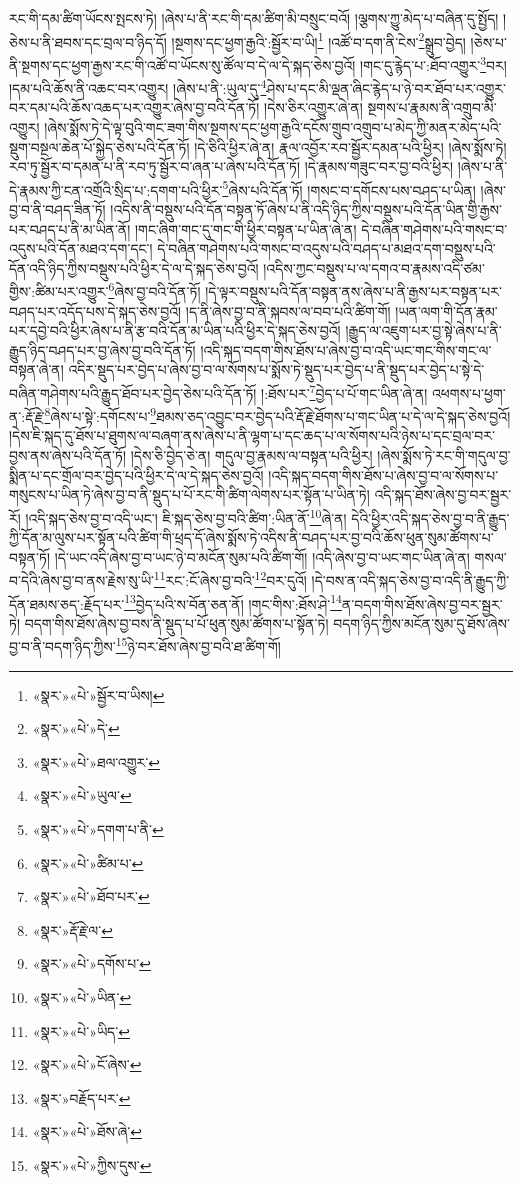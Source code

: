 རང་གི་དམ་ཚིག་ཡོངས་སྤངས་ཏེ། །ཞེས་པ་ནི་རང་གི་དམ་ཚིག་མི་བསྲུང་བའོ། །ལྕགས་ཀྱུ་མེད་པ་བཞིན་དུ་སྤྱོད། །ཅེས་པ་ནི་ཐབས་དང་བྲལ་བ་ཉིད་དོ། །སྔགས་དང་ཕྱག་རྒྱའི་:སྦྱོར་བ་ཡི།\footnote{«སྣར་»«པེ་»སྦྱོར་བ་ཡིས།} །འཚོ་བ་དག་ནི་ངེས་\footnote{«སྣར་»«པེ་»དེ་}སྒྲུབ་བྱེད། །ཅེས་པ་ནི་སྔགས་དང་ཕྱག་རྒྱས་རང་གི་འཚོ་བ་ཡོངས་སུ་ཚོལ་བ་དེ་ལ་དེ་སྐད་ཅེས་བྱའོ། །གང་དུ་རྙེད་པ་:ཐོབ་འགྱུར་\footnote{«སྣར་»«པེ་»ཐལ་འགྱུར་}བར། །དམ་པའི་ཆོས་ནི་འཆང་བར་འགྱུར། །ཞེས་པ་ནི་:ཡུལ་དུ་\footnote{«སྣར་»«པེ་»ཡུལ་}ཤེས་པ་དང་མི་ལྡན་ཞིང་རྙེད་པ་ཉེ་བར་ཐོབ་པར་འགྱུར་བར་དམ་པའི་ཆོས་འཆད་པར་འགྱུར་ཞེས་བྱ་བའི་དོན་ཏོ། །དེས་ཅིར་འགྱུར་ཞེ་ན། སྔགས་པ་རྣམས་ནི་འགྲུབ་མི་འགྱུར། །ཞེས་སྨོས་ཏེ་དེ་ལྟ་བུའི་གང་ཟག་གིས་སྔགས་དང་ཕྱག་རྒྱའི་དངོས་གྲུབ་འགྲུབ་པ་མེད་ཀྱི་མནར་མེད་པའི་སྡུག་བསྔལ་ཆེན་པོ་སྐྱེད་ཅེས་པའི་དོན་ཏོ། །དེ་ཅིའི་ཕྱིར་ཞེ་ན། རྣལ་འབྱོར་རབ་སྦྱོར་དམན་པའི་ཕྱིར། །ཞེས་སྨོས་ཏེ། རབ་ཏུ་སྦྱོར་བ་དམན་པ་ནི་རབ་ཏུ་སྦྱོར་བ་ཞན་པ་ཞེས་པའི་དོན་ཏོ། །དེ་རྣམས་གཟུང་བར་བྱ་བའི་ཕྱིར། །ཞེས་པ་ནི་དེ་རྣམས་ཀྱི་ངན་འགྲོའི་སྲིད་པ་:དགག་པའི་ཕྱིར་\footnote{«སྣར་»«པེ་»དགག་པ་ནི་}ཞེས་པའི་དོན་ཏོ། །གསང་བ་དགོངས་པས་བཤད་པ་ཡིན། །ཞེས་བྱ་བ་ནི་བཤད་ཟིན་ཏོ། །འདིས་ནི་བསྡུས་པའི་དོན་བསྟན་ཏོ་ཞེས་པ་ནི་འདི་ཉིད་ཀྱིས་བསྡུས་པའི་དོན་ཡིན་གྱི་རྒྱས་པར་བཤད་པ་ནི་མ་ཡིན་ནོ། །གང་ཞིག་གང་དུ་གང་གི་ཕྱིར་བསྟན་པ་ཡིན་ཞེ་ན། དེ་བཞིན་གཤེགས་པའི་གསང་བ་འདུས་པའི་དོན་མཐའ་དག་དང་། དེ་བཞིན་གཤེགས་པའི་གསང་བ་འདུས་པའི་བཤད་པ་མཐའ་དག་བསྡུས་པའི་དོན་འདི་ཉིད་ཀྱིས་བསྡུས་པའི་ཕྱིར་དེ་ལ་དེ་སྐད་ཅེས་བྱའོ། །འདིས་ཀྱང་བསྡུས་པ་ལ་དགའ་བ་རྣམས་འདི་ཙམ་གྱིས་:ཚིམ་པར་འགྱུར་\footnote{«སྣར་»«པེ་»ཚིམ་པ་}ཞེས་བྱ་བའི་དོན་ཏོ། །དེ་ལྟར་བསྡུས་པའི་དོན་བསྟན་ནས་ཞེས་པ་ནི་རྒྱས་པར་བསྟན་པར་བཤད་པར་འདོད་པས་དེ་སྐད་ཅེས་བྱའོ། །ད་ནི་ཞེས་བྱ་བ་ནི་སྐབས་ལ་བབ་པའི་ཚིག་གོ། །ཡན་ལག་གི་དོན་རྣམ་པར་དབྱེ་བའི་ཕྱིར་ཞེས་པ་ནི་རྩ་བའི་དོན་མ་ཡིན་པའི་ཕྱིར་དེ་སྐད་ཅེས་བྱའོ། །རྒྱུད་ལ་འཇུག་པར་བྱ་སྟེ་ཞེས་པ་ནི་རྒྱུད་ཉིད་བཤད་པར་བྱ་ཞེས་བྱ་བའི་དོན་ཏོ། །འདི་སྐད་བདག་གིས་ཐོས་པ་ཞེས་བྱ་བ་འདི་ཡང་གང་གིས་གང་ལ་བསྟན་ཞེ་ན། འདིར་སྡུད་པར་བྱེད་པ་ཞེས་བྱ་བ་ལ་སོགས་པ་སྨོས་ཏེ་སྡུད་པར་བྱེད་པ་ནི་སྡུད་པར་བྱེད་པ་སྟེ་དེ་བཞིན་གཤེགས་པའི་རྒྱུད་ཐོབ་པར་བྱེད་ཅེས་པའི་དོན་ཏོ། །:ཐོས་པར་\footnote{«སྣར་»«པེ་»ཐོབ་པར་}བྱེད་པ་པོ་གང་ཡིན་ཞེ་ན། འཕགས་པ་ཕྱག་ན་:རྡོ་རྗེ་\footnote{«སྣར་»རྡོ་རྗེ་ལ་}ཞེས་པ་སྟེ་:དགོངས་པ་\footnote{«སྣར་»«པེ་»དགོས་པ་}ཐམས་ཅད་འབྱུང་བར་བྱེད་པའི་རྡོ་རྗེ་ཐོགས་པ་གང་ཡིན་པ་དེ་ལ་དེ་སྐད་ཅེས་བྱའོ། །དེས་ཇི་སྐད་དུ་ཐོས་པ་ཐུགས་ལ་བཞག་ནས་ཞེས་པ་ནི་ལྷག་པ་དང་ཆད་པ་ལ་སོགས་པའི་ཉེས་པ་དང་བྲལ་བར་བྱས་ནས་ཞེས་པའི་དོན་ཏོ། །དེས་ཅི་བྱེད་ཅེ་ན། གདུལ་བྱ་རྣམས་ལ་བསྟན་པའི་ཕྱིར། །ཞེས་སྨོས་ཏེ་རང་གི་གདུལ་བྱ་སྨིན་པ་དང་གྲོལ་བར་བྱེད་པའི་ཕྱིར་དེ་ལ་དེ་སྐད་ཅེས་བྱའོ། །འདི་སྐད་བདག་གིས་ཐོས་པ་ཞེས་བྱ་བ་ལ་སོགས་པ་གསུངས་པ་ཡིན་ཏེ་ཞེས་བྱ་བ་ནི་སྡུད་པ་པོ་རང་གི་ཚིག་ལེགས་པར་སྟོན་པ་ཡིན་ཏེ། འདི་སྐད་ཐོས་ཞེས་བྱ་བར་སྦྱར་རོ། །འདི་སྐད་ཅེས་བྱ་བ་འདི་ཡང་། ཇི་སྐད་ཅེས་བྱ་བའི་ཚིག་:ཡིན་ནོ་\footnote{«སྣར་»«པེ་»ཡིན་}ཞེ་ན། དེའི་ཕྱིར་འདི་སྐད་ཅེས་བྱ་བ་ནི་རྒྱུད་ཀྱི་དོན་མ་ལུས་པར་སྟོན་པའི་ཚིག་གི་ཕྲད་དོ་ཞེས་སྨོས་ཏེ་འདིས་ནི་བཤད་པར་བྱ་བའི་ཆོས་ཕུན་སུམ་ཚོགས་པ་བསྟན་ཏོ། །དེ་ཡང་འདི་ཞེས་བྱ་བ་ཡང་ཉེ་བ་མངོན་སུམ་པའི་ཚིག་གོ། །འདི་ཞེས་བྱ་བ་ཡང་གང་ཡིན་ཞེ་ན། གསལ་བ་དེའི་ཞེས་བྱ་བ་ནས་རྗེས་སུ་ཡི་\footnote{«སྣར་»«པེ་»ཡིད་}རང་:ངོ་ཞེས་བྱ་བའི་\footnote{«སྣར་»«པེ་»ངོ་ཞེས་}བར་དུའོ། །དེ་བས་ན་འདི་སྐད་ཅེས་བྱ་བ་འདི་ནི་རྒྱུད་ཀྱི་དོན་ཐམས་ཅད་:རྗོད་པར་\footnote{«སྣར་»བརྗོད་པར་}བྱེད་པའི་ས་བོན་ཅན་ནོ། །གང་གིས་:ཐོས་ཤེ་\footnote{«སྣར་»«པེ་»ཐོས་ཞེ་}ན་བདག་གིས་ཐོས་ཞེས་བྱ་བར་སྦྱར་ཏེ། བདག་གིས་ཐོས་ཞེས་བྱ་བས་ནི་སྡུད་པ་པོ་ཕུན་སུམ་ཚོགས་པ་སྟོན་ཏེ། བདག་ཉིད་ཀྱིས་མངོན་སུམ་དུ་ཐོས་ཞེས་བྱ་བ་ནི་བདག་ཉིད་ཀྱིས་\footnote{«སྣར་»«པེ་»ཀྱིས་དུས་}ཉེ་བར་ཐོས་ཞེས་བྱ་བའི་ཐ་ཚིག་གོ། 